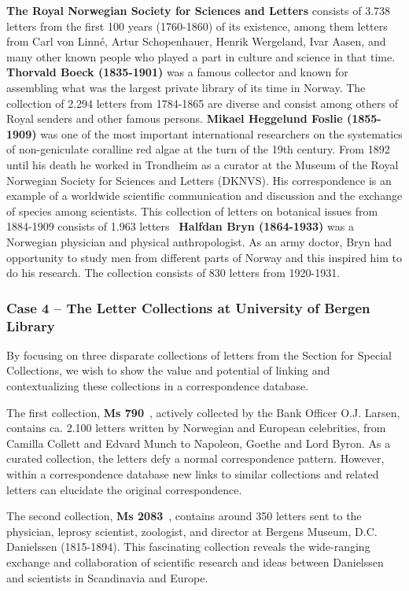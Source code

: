 \documentclass[runningheads]{llncs}
\begin{document}
\textbf{The Royal Norwegian Society for Sciences and Letters} consists of 3.738 letters from the first 100 years (1760-1860) of its existence, among them letters from Carl von Linné, Artur Schopenhauer, Henrik Wergeland, Ivar Aasen, and many other known people who played a part in culture and science in that time.
\textbf{Thorvald Boeck (1835-1901)} was a famous collector and known for assembling what was the largest private library of its time in Norway. The collection of 2.294 letters from 1784-1865 are diverse and consist among others of Royal senders and other famous persons. 
\textbf{Mikael Heggelund Foslie (1855-1909)} was one of the most important international researchers on the systematics of non-geniculate coralline red algae at the turn of the 19th century. From 1892 until his death he worked in Trondheim as a curator at the Museum of the Royal Norwegian Society for Sciences and Letters (DKNVS). His correspondence is an example of a worldwide scientific communication and discussion and the exchange of species among scientists. This  collection of letters on botanical issues from 1884-1909 consists of 1.963 letters~\cite{ref_algae}
\textbf{Halfdan Bryn (1864-1933)} was a Norwegian physician and physical anthropologist. As an army doctor, Bryn had opportunity to study men from different parts of Norway and this inspired him to do his research. The collection consists of 830 letters from 1920-1931.~\cite{ref_halfdan}

\subsubsection{Case 4 -- The Letter Collections at University of Bergen Library}
By focusing on three disparate collections of letters from the Section
for Special Collections, we wish to show the value and potential of
linking and contextualizing these collections in a correspondence
database.

The first collection, \textbf{Ms 790}~\cite{ref_url6},
actively collected by the Bank Officer O.J. Larsen, contains ca. 2.100 letters written by Norwegian and European celebrities, from Camilla
Collett and Edvard Munch to Napoleon, Goethe and Lord Byron. As a
curated collection, the letters defy a normal correspondence
pattern. However, within a correspondence database new links to similar
collections and related letters can elucidate the original correspondence.

The second collection, \textbf{Ms 2083}~\cite{ref_url7},
contains around 350 letters sent to the physician, leprosy scientist,
zoologist, and director at Bergens Museum, D.C. Danielssen (1815-1894).
This fascinating collection reveals the wide-ranging exchange and
collaboration of scientific research and ideas between Danielssen and
scientists in Scandinavia and Europe.
\end{document}
